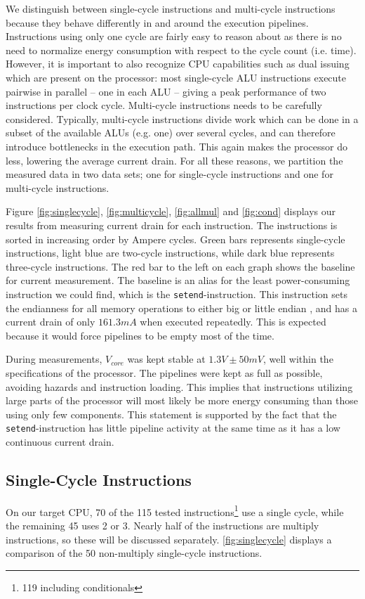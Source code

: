 We distinguish between single-cycle instructions and multi-cycle instructions
because they behave differently in and around the execution pipelines.
Instructions using only one cycle are fairly easy to reason about as there is no
need to normalize energy consumption with respect to the cycle count (i.e.
time). However, it is important to also recognize CPU capabilities such as dual
issuing which are present on the processor: most single-cycle ALU instructions
execute pairwise in parallel -- one in each ALU -- giving a peak performance of
two instructions per clock cycle. Multi-cycle instructions needs to be carefully
considered. Typically, multi-cycle instructions divide work which can be done in
a subset of the available ALUs (e.g. one) over several cycles, and can therefore
introduce bottlenecks in the execution path. This again makes the processor do
less, lowering the average current drain. For all these reasons, we partition the
measured data in two data sets; one for single-cycle instructions and one for
multi-cycle instructions.

Figure \ref{fig:singlecycle}, \ref{fig:multicycle}, \ref{fig:allmul} and
\ref{fig:cond} displays our results from measuring current drain for each
instruction. The instructions is sorted in increasing order by Ampere cycles.
Green bars represents single-cycle instructions, light blue are two-cycle
instructions, while dark blue represents three-cycle instructions.  The red bar
to the left on each graph shows the baseline for current measurement.  The
baseline is an alias for the least power-consuming instruction we could find,
which is the \texttt{setend}-instruction. This instruction sets the endianness
for all memory operations to either big or little endian \cite{armcompilerref},
and has a current drain of only $161.3mA$ when executed repeatedly. This is
expected because it would force pipelines to be empty most of the time.

During measurements, $V_{core}$ was kept stable at $1.3V\pm50mV$, well within
the specifications of the processor. The pipelines were kept as full as
possible, avoiding hazards and instruction loading. This implies that
instructions utilizing large parts of the processor will most likely be more
energy consuming than those using only few components. This statement is
supported by the fact that the \texttt{setend}-instruction has little pipeline
activity at the same time as it has a low continuous current drain.

\subsection{Single-Cycle Instructions}
On our target CPU, 70 of the 115 tested instructions\footnote{119 including
conditionals} use a single cycle, while the remaining 45 uses 2 or 3.  Nearly
half of the instructions are multiply instructions, so these will be discussed
separately. \autoref{fig:singlecycle} displays a comparison of the 50
non-multiply single-cycle instructions.

